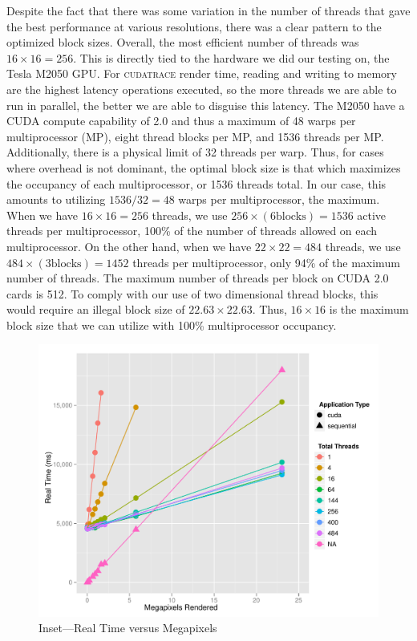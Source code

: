 \documentclass[12pt]{article}
\begin{document}
Despite the fact that there was some variation in the number of threads that gave the best performance at various resolutions, there was a clear pattern to the optimized block sizes. Overall, the most efficient number of threads was $16 \times 16 = 256$. This is directly tied to the hardware we did our testing on, the Tesla M2050 GPU. For \textsc{cudatrace} render time, reading and writing to memory are the highest latency operations executed, so the more threads we are able to run in parallel, the better we are able to disguise this latency. The M2050 have a CUDA compute capability of 2.0 and thus a maximum of 48 warps per multiprocessor (MP), eight thread blocks per MP, and 1536 threads per MP. Additionally, there is a physical limit of 32 threads per warp. Thus, for cases where overhead is not dominant, the optimal block size is that which maximizes the occupancy of each multiprocessor, or 1536 threads total.  In our case, this amounts to utilizing $1536/32 = 48$ warps per multiprocessor, the maximum. When we have $16 \times 16 = 256$ threads, we use $256 \times (6 \text{blocks}) = 1536$ active threads per multiprocessor, 100\% of the number of threads allowed on each multiprocessor. On the other hand, when we have $22 \times 22 = 484$ threads, we use $484 \times (3 \text{blocks}) = 1452$ threads per multiprocessor, only 94\% of the maximum number of threads. The maximum number of threads per block on CUDA 2.0 cards is 512. To comply with our use of two dimensional thread blocks, this would require an illegal block size of $22.63 \times 22.63$. Thus, $16 \times 16$ is the maximum block size that we can utilize with 100\% multiprocessor occupancy.

\begin{figure}
    \caption{Inset---Real Time versus Megapixels} \label{fig:real_time_zoom3}
    \begin{center}
\includegraphics{cudatrace-010}
    \end{center}
\end{figure}
\end{document}
